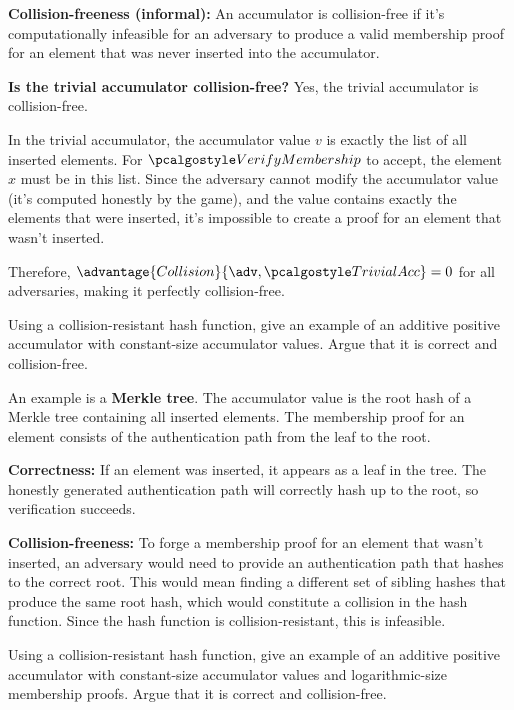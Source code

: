 \ifsolutions
\begin{mysolution}
  \textbf{Collision-freeness (informal):} An accumulator is collision-free if it's computationally infeasible for an adversary to produce a valid membership proof for an element that was never inserted into the accumulator.
  
  \textbf{Is the trivial accumulator collision-free?} Yes, the trivial accumulator is collision-free.
  
  In the trivial accumulator, the accumulator value $v$ is exactly the list of all inserted elements.
  For $\algo{VerifyMembership}$ to accept, the element $x$ must be in this list.
  Since the adversary cannot modify the accumulator value (it's computed honestly by the game), and the value contains exactly the elements that were inserted, it's impossible to create a proof for an element that wasn't inserted.
  
  Therefore, $\advantage{Collision}{\adv, \algo{TrivialAcc}} = 0$ for all adversaries, making it perfectly collision-free.
\end{mysolution}
\fi

\begin{exercise}
  Using a collision-resistant hash function, give an example of an additive positive accumulator with constant-size accumulator values.
  Argue that it is correct and collision-free.
\end{exercise}

\ifsolutions
\begin{mysolution}
  An example is a \textbf{Merkle tree}.
  The accumulator value is the root hash of a Merkle tree containing all inserted elements.
  The membership proof for an element consists of the authentication path from the leaf to the root.
  
  \textbf{Correctness:} If an element was inserted, it appears as a leaf in the tree.
  The honestly generated authentication path will correctly hash up to the root, so verification succeeds.
  
  \textbf{Collision-freeness:} To forge a membership proof for an element that wasn't inserted, an adversary would need to provide an authentication path that hashes to the correct root.
  This would mean finding a different set of sibling hashes that produce the same root hash, which would constitute a collision in the hash function.
  Since the hash function is collision-resistant, this is infeasible.
\end{mysolution}
\fi

\begin{exercise}[Optional]
  Using a collision-resistant hash function, give an example of an additive positive accumulator with constant-size accumulator values and logarithmic-size membership proofs.
  Argue that it is correct and collision-free.
\end{exercise}

